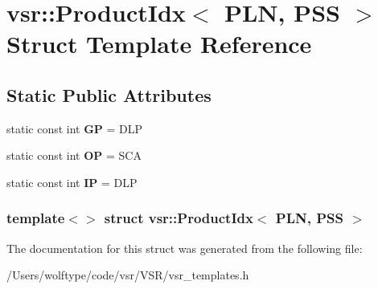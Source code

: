 \hypertarget{structvsr_1_1_product_idx_3_01_p_l_n_00_01_p_s_s_01_4}{\section{vsr\-:\-:Product\-Idx$<$ P\-L\-N, P\-S\-S $>$ Struct Template Reference}
\label{structvsr_1_1_product_idx_3_01_p_l_n_00_01_p_s_s_01_4}
}
\subsection*{Static Public Attributes}
\begin{DoxyCompactItemize}
\item 
\hypertarget{structvsr_1_1_product_idx_3_01_p_l_n_00_01_p_s_s_01_4_abea69f577e44d1753c1fd92cff3ef43d}{static const int {\bfseries G\-P} = D\-L\-P}\label{structvsr_1_1_product_idx_3_01_p_l_n_00_01_p_s_s_01_4_abea69f577e44d1753c1fd92cff3ef43d}

\item 
\hypertarget{structvsr_1_1_product_idx_3_01_p_l_n_00_01_p_s_s_01_4_afa4e8d713cd5a9d015ebba5513b25357}{static const int {\bfseries O\-P} = S\-C\-A}\label{structvsr_1_1_product_idx_3_01_p_l_n_00_01_p_s_s_01_4_afa4e8d713cd5a9d015ebba5513b25357}

\item 
\hypertarget{structvsr_1_1_product_idx_3_01_p_l_n_00_01_p_s_s_01_4_a5063d32e9c1d5a317ba3292c97357c46}{static const int {\bfseries I\-P} = D\-L\-P}\label{structvsr_1_1_product_idx_3_01_p_l_n_00_01_p_s_s_01_4_a5063d32e9c1d5a317ba3292c97357c46}

\end{DoxyCompactItemize}
\subsubsection*{template$<$$>$ struct vsr\-::\-Product\-Idx$<$ P\-L\-N, P\-S\-S $>$}



The documentation for this struct was generated from the following file\-:\begin{DoxyCompactItemize}
\item 
/\-Users/wolftype/code/vsr/\-V\-S\-R/vsr\-\_\-templates.\-h\end{DoxyCompactItemize}
